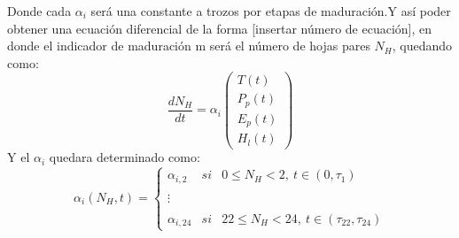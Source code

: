 \documentclass[utf8]{FrontiersinHarvard} %
\begin{document}
Donde cada $\alpha_i$ será una constante a trozos por etapas de maduración.Y así poder obtener una ecuación diferencial de la forma [insertar número de ecuación], en donde el indicador de maduración m será el número de hojas pares $N_H$, quedando como:
\begin{equation}
    \frac{dN_H}{dt}=\alpha_i \begin{pmatrix}
        T(t)  
        \\ P_p(t)
        \\E_p(t)
        \\H_l(t)
    \end{pmatrix}
\end{equation}
Y el $\alpha_i$ quedara determinado como:
\begin{equation}
    \alpha_i(N_H,t)= \left\{ \begin{array}{lcc} \alpha_{i,2} & si & 0 \leq N_H < 2, \ t \in (0,\tau_1) \\ \\ 
        \vdots \\ \\ 
        \alpha_{i,24} & si & 22 \leq N_H < 24, \ t \in (\tau_{22},\tau_{24})
    \end{array} \right.
\end{equation}
\end{document}
